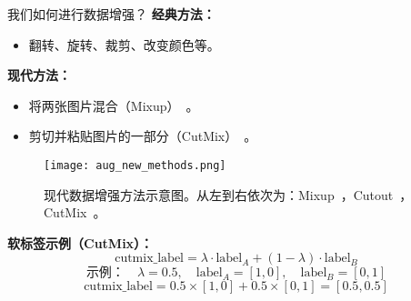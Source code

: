 \begin{refsection}
  \begin{frame}{我们如何进行数据增强？}
    \textbf{经典方法：}
      \begin{itemize}
        \item 翻转、旋转、裁剪、改变颜色等。
      \end{itemize}
      \textbf{现代方法：}
      \begin{itemize}
        \item 将两张图片混合（Mixup）~\parencite{zhangMixupEMPIRICALRISK2018}。
        \item 剪切并粘贴图片的一部分（CutMix）~\parencite{yunCutMixRegularizationStrategy2019}。
      \end{itemize}
    \begin{minipage}{0.58\linewidth}
      \begin{figure}
        \centering
        \texttt{[image: aug\_new\_methods.png]}
        \caption[]{\scriptsize 现代数据增强方法示意图。从左到右依次为：Mixup~\parencite{zhangMixupEMPIRICALRISK2018}，Cutout~\parencite{devriesImprovedRegularizationConvolutional2017}，CutMix~\parencite{yunCutMixRegularizationStrategy2019}。}
      \end{figure}
    \end{minipage}
    \hfill
    \begin{minipage}{0.4\linewidth}
      \tiny
      \textbf{软标签示例（CutMix）：}
      \vspace{0.5em}
      \begin{equation*}
        \text{cutmix\_label} = \lambda \cdot \text{label}_A + (1 - \lambda) \cdot \text{label}_B
      \end{equation*}
      \vspace{-0.5em}
      \begin{equation*}
        \text{示例：} \quad \lambda = 0.5, \quad \text{label}_A = [1, 0], \quad \text{label}_B = [0, 1]
      \end{equation*}
      \vspace{-0.5em}
      \begin{equation*}
        \text{cutmix\_label} = 0.5 \times [1, 0] + 0.5 \times [0, 1] = [0.5, 0.5]
      \end{equation*}
     
  
    \end{minipage}
    \bottomleftrefs
  \end{frame}
  \end{refsection}
  

